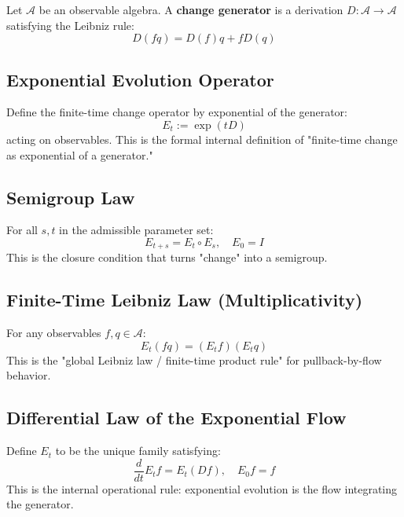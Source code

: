 \documentclass[12pt, oneside]{article}
\begin{document}
Let $\mathcal{A}$ be an observable algebra. A \textbf{change generator} is a derivation $D: \mathcal{A} \rightarrow \mathcal{A}$ satisfying the Leibniz rule:
\begin{equation}
D(fq) = D(f)q + fD(q)
\end{equation}

\subsection{Exponential Evolution Operator}

Define the finite-time change operator by exponential of the generator:
\begin{equation}
E_t := \exp(tD)
\end{equation}
acting on observables. This is the formal internal definition of "finite-time change as exponential of a generator."

\subsection{Semigroup Law}

For all $s, t$ in the admissible parameter set:
\begin{equation}
E_{t+s} = E_t \circ E_s, \quad E_0 = I
\end{equation}
This is the closure condition that turns "change" into a semigroup.

\subsection{Finite-Time Leibniz Law (Multiplicativity)}

For any observables $f, q \in \mathcal{A}$:
\begin{equation}
E_t(fq) = (E_t f)(E_t q)
\end{equation}
This is the "global Leibniz law / finite-time product rule" for pullback-by-flow behavior.

\subsection{Differential Law of the Exponential Flow}

Define $E_t$ to be the unique family satisfying:
\begin{equation}
\frac{d}{dt} E_t f = E_t (Df), \quad E_0 f = f
\end{equation}
This is the internal operational rule: exponential evolution is the flow integrating the generator.
\end{document}
